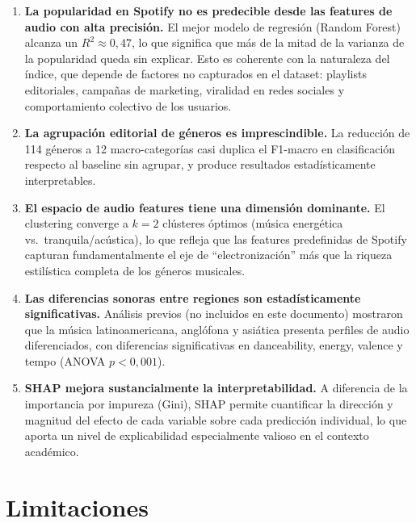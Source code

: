 \documentclass[12pt, a4paper, twoside]{book}
\theoremstyle{definition}
\begin{document}
\begin{enumerate}
  \item \textbf{La popularidad en Spotify no es predecible desde las features de
        audio con alta precisión.} El mejor modelo de regresión (Random Forest)
        alcanza un $R^2 \approx 0{,}47$, lo que significa que más de la mitad
        de la varianza de la popularidad queda sin explicar. Esto es coherente
        con la naturaleza del índice, que depende de factores no capturados en
        el dataset: playlists editoriales, campañas de marketing, viralidad en
        redes sociales y comportamiento colectivo de los usuarios.

  \item \textbf{La agrupación editorial de géneros es imprescindible.} La reducción
        de 114 géneros a 12 macro-categorías casi duplica el F1-macro en
        clasificación respecto al baseline sin agrupar, y produce resultados
        estadísticamente interpretables.

  \item \textbf{El espacio de audio features tiene una dimensión dominante.}
        El clustering converge a $k = 2$ clústeres óptimos (música energética
        vs.\ tranquila/acústica), lo que refleja que las features predefinidas de
        Spotify capturan fundamentalmente el eje de ``electronización'' más que
        la riqueza estilística completa de los géneros musicales.

  \item \textbf{Las diferencias sonoras entre regiones son estadísticamente
        significativas.} Análisis previos (no incluidos en este documento)
        mostraron que la música latinoamericana, anglófona y asiática presenta
        perfiles de audio diferenciados, con diferencias significativas en
        danceability, energy, valence y tempo (ANOVA $p < 0{,}001$).

  \item \textbf{SHAP mejora sustancialmente la interpretabilidad.} A diferencia
        de la importancia por impureza (Gini), SHAP permite cuantificar la
        dirección y magnitud del efecto de cada variable sobre cada predicción
        individual, lo que aporta un nivel de explicabilidad especialmente
        valioso en el contexto académico.
\end{enumerate}

\section{Limitaciones}
\end{document}
